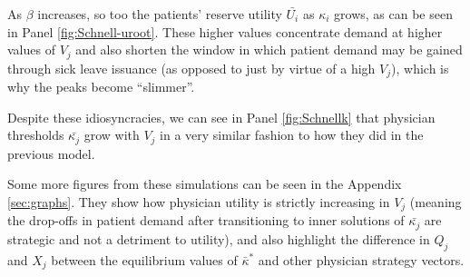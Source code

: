 \documentclass[../main.tex]{subfiles}
\begin{document}
As $\beta$ increases, so too the patients' reserve utility $\bar{U_i}$ as $\kappa_i$ grows, as can be seen in Panel \ref{fig:Schnell-uroot}. These higher values concentrate demand at higher values of $V_j$ and also shorten the window in which patient demand may be gained through sick leave issuance (as opposed to just by virtue of a high $V_j$), which is why the peaks become ``slimmer''.

Despite these idiosyncracies, we can see in Panel \ref{fig:Schnellk} that physician thresholds $\bar{\kappa_j}$ grow with $V_j$ in a very similar fashion to how they did in the previous model.

Some more figures from these simulations can be seen in the Appendix \ref{sec:graphs}. They show how physician utility is strictly increasing in $V_j$ (meaning the drop-offs in patient demand after transitioning to inner solutions of $\bar{\kappa_j}$ are strategic and not a detriment to utility), and also highlight the difference in $Q_j$ and $X_j$ between the equilibrium values of $\bar{\kappa}^*$
and other physician strategy vectors.
\end{document}

